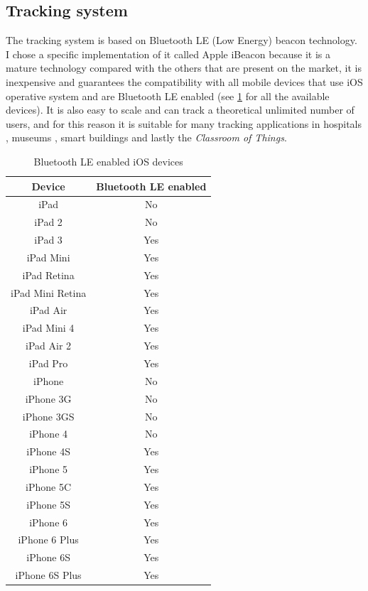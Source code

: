 \subsection{Tracking system}
The tracking system is based on Bluetooth LE (Low Energy) beacon technology. I chose a specific implementation of it called Apple iBeacon because it is a mature technology compared with the others that are present on the market, it is inexpensive and guarantees the compatibility with all mobile devices that use iOS operative system and are Bluetooth LE enabled (see \ref{tab:bluetooth_le_enabled} for all the available devices). It is also easy to scale and can track a theoretical unlimited number of users, and for this reason it is suitable for many tracking applications in hospitals \cite{yang:ibeacon}, museums \cite{he:proposal}, smart buildings \cite{corna:occupancy} and lastly the \textit{Classroom of Things}.

\begin{table}
\centering
\begin{tabular}{ | c | c | }
\hline
Device & Bluetooth LE enabled \\
\hline
\hline
iPad             & No \\
iPad 2           & No \\
iPad 3           & Yes \\
iPad Mini        & Yes \\
iPad Retina      & Yes \\
iPad Mini Retina & Yes \\
iPad Air         & Yes \\
iPad Mini 4      & Yes \\
iPad Air 2       & Yes \\
iPad Pro         & Yes \\
iPhone           & No  \\
iPhone 3G        & No  \\
iPhone 3GS       & No  \\
iPhone 4         & No  \\
iPhone 4S        & Yes \\
iPhone 5         & Yes \\
iPhone 5C        & Yes \\
iPhone 5S        & Yes \\
iPhone 6         & Yes \\
iPhone 6 Plus    & Yes \\
iPhone 6S        & Yes \\
iPhone 6S Plus   & Yes \\

\hline
\end{tabular}
\caption{Bluetooth LE enabled iOS devices}
\label{tab:bluetooth_le_enabled}
\end{table}

